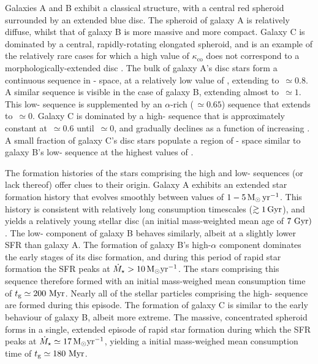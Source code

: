 Galaxies A and B exhibit a classical structure, with a central red spheroid surrounded by an extended blue disc. The spheroid of galaxy A is relatively diffuse, whilst that of galaxy B is more massive and more compact. Galaxy C is dominated by a central, rapidly-rotating elongated spheroid, and is an example of the relatively rare cases for which a high value of $\kappa_{\mathrm{co}}$ does not correspond to a morphologically-extended disc \citep[see][]{2017arXiv170406283C}. The bulk of galaxy A's disc stars form a continuous sequence in \afe{}-\feh{} space, at a relatively low value of \afe{}, extending to \feh{}$\,\simeq 0.8$. A similar sequence is visible in the case of galaxy B, extending almost to \feh{}$\,\simeq 1$. This low-\afe{} sequence is supplemented by an $\alpha$-rich (\afe{}$\,\simeq 0.65$) sequence that extends to  \feh{}$\,\simeq 0$. Galaxy C is dominated by a high-\afe{} sequence that is approximately constant at \afe{}$\,\simeq 0.6$ until \feh{}$\,\simeq 0$, and gradually declines as a function of increasing \feh{}. A small fraction of galaxy C's disc stars populate a region of \afe{}-\feh{} space similar to galaxy B's low-\afe{} sequence at the highest values of \feh{}.

The formation histories of the stars comprising the high and low-\afe{} sequences (or lack thereof) offer clues to their origin. Galaxy A exhibits an extended star formation history that evolves smoothly between values of $1-5\,{\rm M}_\odot\,{\rm yr}^{-1}$. This history is consistent with relatively long consumption timescales ($\gtrsim 1\,{\rm Gyr}$), and yields a relatively young stellar disc (an initial mass-weighted mean age of $7\ {\rm Gyr})$. The low-\afe{} component of galaxy B behaves similarly, albeit at a slightly lower SFR than galaxy A. The formation of galaxy B's high-$\alpha$ component dominates the early stages of its disc formation, and during this period of rapid star formation the SFR peaks at $\dot{M}_\star > 10\,{\rm M}_\odot {\rm yr}^{-1}$. The stars comprising this sequence therefore formed with an initial mass-weighed mean consumption time of $t_{\rm g} \simeq 200\ {\rm Myr}$. Nearly all of the stellar particles comprising the high-\afe{} sequence are formed during this episode. The formation of galaxy C is similar to the early behaviour of galaxy B, albeit more extreme. The massive, concentrated spheroid forms in a single, extended episode of rapid star formation during which the SFR peaks at $\dot{M}_\star \simeq 17\,{\rm M}_\odot {\rm yr}^{-1}$, yielding a initial mass-weighed mean consumption time of  $t_{\rm g} \simeq 180\ {\rm Myr}$. 

